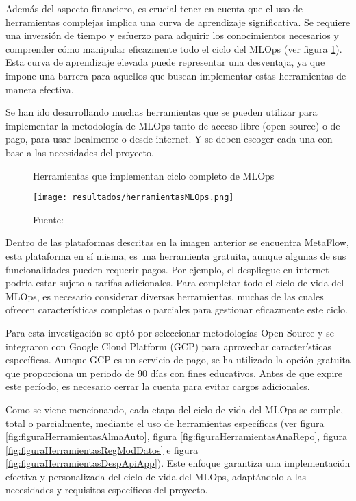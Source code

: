 Además del aspecto financiero, es crucial tener en cuenta que el uso de herramientas complejas implica una curva de aprendizaje significativa. Se requiere una inversión de tiempo y esfuerzo para adquirir los conocimientos necesarios y comprender cómo manipular eficazmente todo el ciclo del MLOps (ver figura \ref{fig:figuraHerramientasMLOps}). Esta curva de aprendizaje elevada puede representar una desventaja, ya que impone una barrera para aquellos que buscan implementar estas herramientas de manera efectiva. \newline

Se han ido desarrollando muchas herramientas que se pueden utilizar para implementar la metodología de MLOps tanto de acceso libre (open source) o de pago, para usar localmente o desde internet. Y se deben escoger cada una con base a las necesidades del proyecto.

\newpage

\begin{figure}[h]
\centering
\caption{Herramientas que implementan ciclo completo de MLOps}
\texttt{[image: resultados/herramientasMLOps.png]}
\caption*{\footnotesize Fuente: \cite{neptune2024}}
\label{fig:figuraHerramientasMLOps}
\end{figure}

Dentro de las plataformas descritas en la imagen anterior se encuentra MetaFlow, esta plataforma en sí misma, es una herramienta gratuita, aunque algunas de sus funcionalidades pueden requerir pagos. Por ejemplo, el despliegue en internet podría estar sujeto a tarifas adicionales. Para completar todo el ciclo de vida del MLOps, es necesario considerar diversas herramientas, muchas de las cuales ofrecen características completas o parciales para gestionar eficazmente este ciclo. \newline

Para esta investigación se optó por seleccionar metodologías Open Source y se integraron  con Google Cloud Platform (GCP) para aprovechar características específicas. Aunque GCP es un servicio de pago, se ha utilizado la opción gratuita que proporciona un periodo de 90 días con fines educativos. Antes de que expire este período, es necesario cerrar la cuenta para evitar cargos adicionales. \newline

Como se viene mencionando, cada etapa del ciclo de vida del MLOps se cumple, total o parcialmente, mediante el uso de herramientas específicas (ver figura \ref{fig:figuraHerramientasAlmaAuto}, figura \ref{fig:figuraHerramientasAnaRepo}, figura \ref{fig:figuraHerramientasRegModDatos} e figura \ref{fig:figuraHerramientasDespApiApp}). Este enfoque garantiza una implementación efectiva y personalizada del ciclo de vida del MLOps, adaptándolo a las necesidades y requisitos específicos del proyecto.

